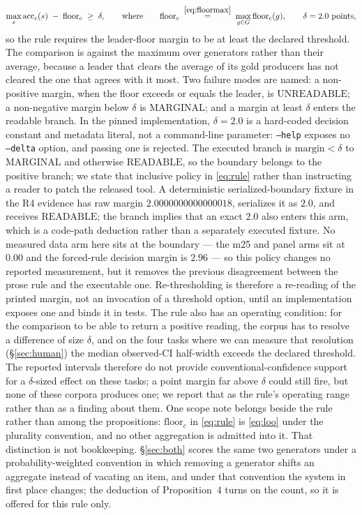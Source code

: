 \documentclass{article}
\begin{document}
\begin{equation}
\max_s \mathrm{acc}_{c}(s) \;-\; \mathrm{floor}_c \;\ge\; \delta,
\qquad\text{where}\qquad
\mathrm{floor}_c \;\overset{\eqref{eq:floormax}}{=}\; \max_{g \in G} \mathrm{floor}_c(g),
\qquad \delta = 2.0\ \text{points},
\label{eq:rule}
\end{equation} so the rule requires the leader-floor margin to be at least the declared threshold. The comparison is against the maximum over generators rather than their average, because a leader that clears the average of its gold producers has not cleared the one that agrees with it most. Two failure modes are named: a non-positive margin, when the floor exceeds or equals the leader, is $\mathrm{UNREADABLE}$; a non-negative margin below $\delta$ is $\mathrm{MARGINAL}$; and a margin at least $\delta$ enters the readable branch. In the pinned implementation, $\delta=2.0$ is a hard-coded decision constant and metadata literal, not a command-line parameter: \texttt{--help} exposes no \texttt{--delta} option, and passing one is rejected. The executed branch is $\mathrm{margin}<\delta$ to $\mathrm{MARGINAL}$ and otherwise $\mathrm{READABLE}$, so the boundary belongs to the positive branch; we state that inclusive policy in \eqref{eq:rule} rather than instructing a reader to patch the released tool. A deterministic serialized-boundary fixture in the R4 evidence has raw margin $2.0000000000000018$, serializes it as $2.0$, and receives $\mathrm{READABLE}$; the branch implies that an exact $2.0$ also enters this arm, which is a code-path deduction rather than a separately executed fixture. No measured data arm here sits at the boundary --- the m25 and panel arms sit at $0.00$ and the forced-rule decision margin is $2.96$ --- so this policy changes no reported measurement, but it removes the previous disagreement between the prose rule and the executable one. Re-thresholding is therefore a re-reading of the printed margin, not an invocation of a threshold option, until an implementation exposes one and binds it in tests. The rule also has an operating condition: for the comparison to be able to return a positive reading, the corpus has to resolve a difference of size $\delta$, and on the four tasks where we can measure that resolution (\S\ref{sec:human}) the median observed-CI half-width exceeds the declared threshold. The reported intervals therefore do not provide conventional-confidence support for a $\delta$-sized effect on these tasks; a point margin far above $\delta$ could still fire, but none of these corpora produces one; we report that as the rule's operating range rather than as a finding about them. One scope note belongs beside the rule rather than among the propositions: $\mathrm{floor}_c$ in \eqref{eq:rule} is \eqref{eq:loo} under the plurality convention, and no other aggregation is admitted into it. That distinction is not bookkeeping. \S\ref{sec:both} scores the same two generators under a probability-weighted convention in which removing a generator shifts an aggregate instead of vacating an item, and under that convention the system in first place changes; the deduction of Proposition~4 turns on the count, so it is offered for this rule only.
\end{document}
